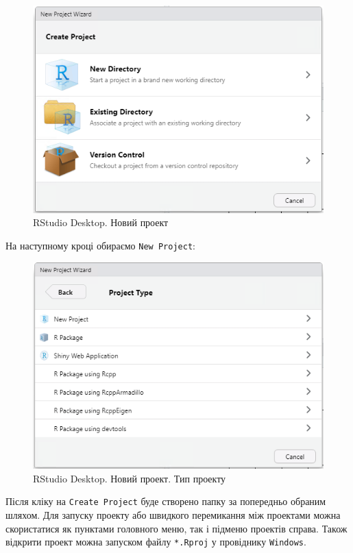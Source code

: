 \documentclass[
]{book}
\begin{document}
\begin{figure}
\centering
\includegraphics{images/chapter1/rstudio_6.png}
\caption{\label{fig:unnamed-chunk-17}RStudio Desktop. Новий проект}
\end{figure}

На наступному кроці обираємо \texttt{New\ Project}:

\begin{figure}
\centering
\includegraphics{images/chapter1/rstudio_7.png}
\caption{\label{fig:unnamed-chunk-18}RStudio Desktop. Новий проект. Тип проекту}
\end{figure}

Після кліку на \texttt{Create\ Project} буде створено папку за попередньо обраним шляхом. Для запуску проекту або швидкого перемикання між проектами можна скористатися як пунктами головного меню, так і підменю проектів справа. Також відкрити проект можна запуском файлу \texttt{*.Rproj} у провіднику \texttt{Windows}.
\end{document}

